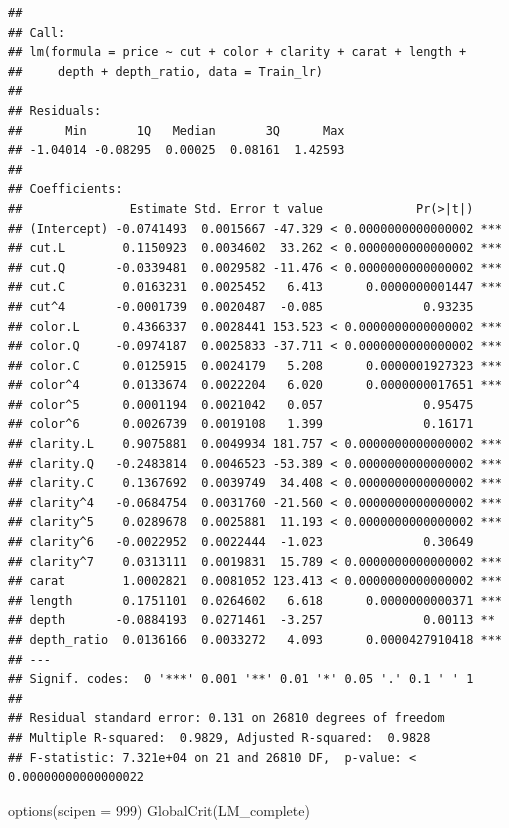 \documentclass[
]{article}
\newenvironment{Shaded}{\begin{snugshade}}{\end{snugshade}}
\newcommand{\AttributeTok}[1]{\textcolor[rgb]{0.77,0.63,0.00}{#1}}
\newcommand{\DecValTok}[1]{\textcolor[rgb]{0.00,0.00,0.81}{#1}}
\newcommand{\FunctionTok}[1]{\textcolor[rgb]{0.00,0.00,0.00}{#1}}
\newcommand{\NormalTok}[1]{#1}
\begin{document}
\begin{verbatim}
## 
## Call:
## lm(formula = price ~ cut + color + clarity + carat + length + 
##     depth + depth_ratio, data = Train_lr)
## 
## Residuals:
##      Min       1Q   Median       3Q      Max 
## -1.04014 -0.08295  0.00025  0.08161  1.42593 
## 
## Coefficients:
##               Estimate Std. Error t value             Pr(>|t|)    
## (Intercept) -0.0741493  0.0015667 -47.329 < 0.0000000000000002 ***
## cut.L        0.1150923  0.0034602  33.262 < 0.0000000000000002 ***
## cut.Q       -0.0339481  0.0029582 -11.476 < 0.0000000000000002 ***
## cut.C        0.0163231  0.0025452   6.413      0.0000000001447 ***
## cut^4       -0.0001739  0.0020487  -0.085              0.93235    
## color.L      0.4366337  0.0028441 153.523 < 0.0000000000000002 ***
## color.Q     -0.0974187  0.0025833 -37.711 < 0.0000000000000002 ***
## color.C      0.0125915  0.0024179   5.208      0.0000001927323 ***
## color^4      0.0133674  0.0022204   6.020      0.0000000017651 ***
## color^5      0.0001194  0.0021042   0.057              0.95475    
## color^6      0.0026739  0.0019108   1.399              0.16171    
## clarity.L    0.9075881  0.0049934 181.757 < 0.0000000000000002 ***
## clarity.Q   -0.2483814  0.0046523 -53.389 < 0.0000000000000002 ***
## clarity.C    0.1367692  0.0039749  34.408 < 0.0000000000000002 ***
## clarity^4   -0.0684754  0.0031760 -21.560 < 0.0000000000000002 ***
## clarity^5    0.0289678  0.0025881  11.193 < 0.0000000000000002 ***
## clarity^6   -0.0022952  0.0022444  -1.023              0.30649    
## clarity^7    0.0313111  0.0019831  15.789 < 0.0000000000000002 ***
## carat        1.0002821  0.0081052 123.413 < 0.0000000000000002 ***
## length       0.1751101  0.0264602   6.618      0.0000000000371 ***
## depth       -0.0884193  0.0271461  -3.257              0.00113 ** 
## depth_ratio  0.0136166  0.0033272   4.093      0.0000427910418 ***
## ---
## Signif. codes:  0 '***' 0.001 '**' 0.01 '*' 0.05 '.' 0.1 ' ' 1
## 
## Residual standard error: 0.131 on 26810 degrees of freedom
## Multiple R-squared:  0.9829, Adjusted R-squared:  0.9828 
## F-statistic: 7.321e+04 on 21 and 26810 DF,  p-value: < 0.00000000000000022
\end{verbatim}

\begin{Shaded}
\begin{Highlighting}[]
\FunctionTok{options}\NormalTok{(}\AttributeTok{scipen =} \DecValTok{999}\NormalTok{)}
\FunctionTok{GlobalCrit}\NormalTok{(LM\_complete)}
\end{Highlighting}
\end{Shaded}
\end{document}
